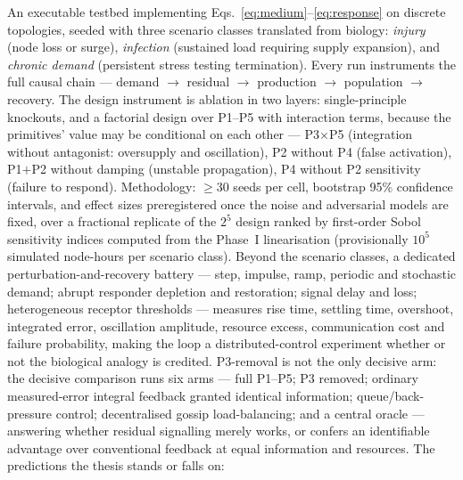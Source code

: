 \documentclass[twoside,twocolumn,usenatbib]{mnras}
\begin{document}
An executable testbed implementing
Eqs.~\ref{eq:medium}--\ref{eq:response} on discrete topologies, seeded
with three scenario classes translated from biology: \emph{injury}
(node loss or surge), \emph{infection} (sustained load requiring
supply expansion), and \emph{chronic demand} (persistent stress
testing termination). Every run instruments the full
causal chain --- demand $\to$ residual $\to$ production $\to$
population $\to$ recovery. The design instrument is ablation in two
layers: single-principle knockouts, and a factorial design over
P1--P5 with interaction terms, because the primitives' value may be
conditional on each other --- P3$\times$P5 (integration without
antagonist: oversupply and oscillation), P2 without P4 (false
activation), P1$+$P2 without damping (unstable propagation), P4 without P2 sensitivity (failure to
respond). Methodology:
$\ge 30$ seeds per cell, bootstrap 95\% confidence intervals, and
effect sizes preregistered once the noise and adversarial models are
fixed, over a fractional replicate of the $2^5$ design ranked by
first-order Sobol sensitivity indices computed from the Phase~I
linearisation (provisionally $10^5$ simulated node-hours per
scenario class). Beyond the scenario classes, a dedicated
perturbation-and-recovery battery --- step, impulse, ramp, periodic
and stochastic demand; abrupt responder depletion and restoration;
signal delay and loss; heterogeneous receptor thresholds --- measures
rise time, settling time, overshoot, integrated error, oscillation
amplitude, resource excess, communication cost and failure
probability, making the loop a distributed-control experiment whether
or not the biological analogy is credited. P3-removal is not the only
decisive arm: the decisive comparison runs six arms --- full P1--P5;
P3 removed; ordinary measured-error integral feedback granted
identical information; queue/back-pressure control; decentralised
gossip load-balancing; and a central oracle --- answering whether
residual signalling merely works, or confers an identifiable advantage
over conventional feedback at equal information and resources. The
predictions the thesis stands or falls on:
\end{document}

